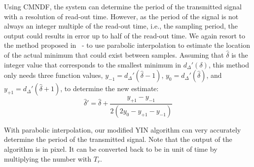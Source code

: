 Using CMNDF, the system can determine the period of the transmitted signal with a resolution of read-out time. However, as the period of the signal is not always an integer multiple of the read-out time, i.e., the sampling period, the output could results in error up to half of the read-out time. We again resort to the method proposed in~\cite{de2002yin} - to use parabolic interpolation to estimate the location of the actual minimum that could exist between samples. Assuming that $\hat{\delta}$ is the integer value that corresponds to the smallest minimum in $d_\Delta'(\delta)$, this method only needs three function values, $y_{-1}=d_\Delta'(\hat{\delta}-1)$, $y_{0}=d_\Delta'(\hat{\delta})$, and $y_{+1}=d_\Delta'(\hat{\delta}+1)$, to determine the new estimate:
\begin{equation}
	\hat{\delta}'=\hat{\delta}+\frac{y_{+1}-y_{-1}}{2 (2 y_0 - y_{+1} - y_{-1})}
\end{equation}

With parabolic interpolation, our modified YIN algorithm can very accurately determine the period of the transmitted signal. Note that the output of the algorithm is in pixel. It can be converted back to be in unit of time by multiplying the number with $T_r$.
